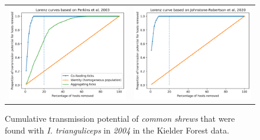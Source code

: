 \documentclass{article}
\begin{document}
\begin{figure}[h!]
	\centering
	\begin{tabular}{ll}
		\includegraphics[width=.48\linewidth,valign=m]{lorenz_perkins_SA_2004_I.Trianguliceps} & \includegraphics[width=.48\linewidth,valign=m]{lorenz_JR_SA_2004_I.Trianguliceps} \\
	\end{tabular}
	\caption{Cumulative transmission potential of \textit{common shrews} that were found with \textit{I. trianguliceps} in \textit{2004} in the Kielder Forest data.}
	\label{fig:lorenz_2005_iricinus_SA}
\end{figure}
\end{document}
